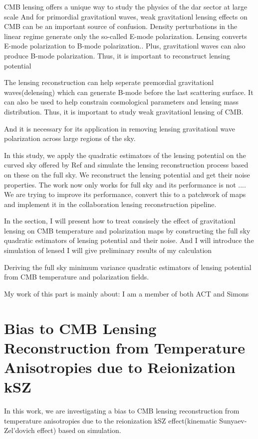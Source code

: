\documentclass[12pt, notitlepage, onecolumn, amsmath, amssymb, aps]{revtex4-1}
\begin{document}
CMB lensing offers a unique way to study the physics of the dar sector at large scale 
And for primordial gravitationl waves, weak gravitationl lensing effects on CMB can be an important source of confusion\cite{Lewis:2006fu}. Density perturbations in the linear regime generate only the so-called E-mode polarization\cite{Kamionkowski:1996ks}. Lensing converts E-mode polarization to B-mode polarization.\cite{Zaldarriaga:1998ar}. Plus, gravitationl waves can also produce B-mode polarization\cite{Hu:2000ee}. Thus, it is important to reconstruct lensing potential


The lensing reconstruction can help seperate premordial gravitationl waves(delensing) which can generate B-mode before the last scattering surface. It can also be used to help constrain cosmological parameters and lensing mass distribution. Thus, it is important to study weak gravitationl lensing of CMB.



 And it is necessary for its application in removing lensing gravitationl wave polarization across large regions of the sky.

In this study, we apply the quadratic estimators of the lensing potential on the curved sky offered by Ref\cite{Okamoto:2003zw} and simulate the lensing reconstruction process based on these on the full sky. We reconstruct the lensing potential and get their noise properties. The work now only works for full sky and its performance is not ....  We are trying to improve its performance, convert this to a patchwork of maps and implement it in the collaboration lensing reconstruction pipeline.

In the section, I will present how to treat consisely the effect of gravitationl lensing on CMB temperature and polarization maps by constructing the full sky quadratic estimators of lensing potential and their noise. And I will introduce the simulation of lensed I will give preliminary results of my calculation 

Deriving the full sky minimum variance quadratic estimators of lensing potential from CMB temperature and polarization fields.

My work of this part is mainly about:
I am a member of both ACT and Simons


\section{Bias to CMB Lensing Reconstruction from Temperature Anisotropies due to Reionization kSZ}
\label{sec:org093d799}
In this work, we are investigating a bias to CMB lensing reconstruction from temperature anisotropies due to the reionization kSZ effect(kinematic Sunyaev-Zel'dovich effect) based on simulation.
\end{document}
